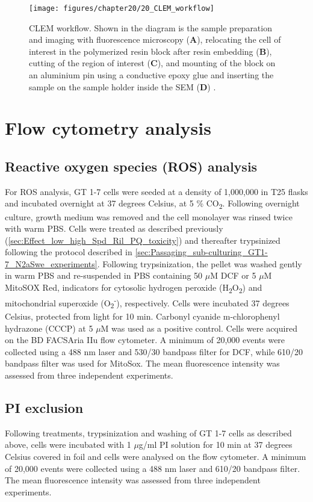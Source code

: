 \begin{figure}[!htbp]
  \texttt{[image: figures/chapter20/20\_CLEM\_workflow]}
  \caption[CLEM workflow]{CLEM workflow. Shown in the diagram is the sample preparation and imaging with fluorescence microscopy (\textbf{A}), relocating the cell of interest in the polymerized resin block after resin embedding (\textbf{B}), cutting of the region of interest (\textbf{C}), and mounting of the block on an aluminium pin using a conductive epoxy glue and inserting the sample on the sample holder inside the SEM (\textbf{D}) \citep{Russell2017}.}
  \label{fig:20_CLEM_workflow}
\end{figure}


\section{Flow cytometry analysis}
\subsection{Reactive oxygen species (ROS) analysis}
For ROS analysis, GT 1-7 cells were seeded at a density of 1,000,000 in T25 flasks and incubated overnight at 37 degrees Celsius, at 5 \% CO\textsubscript{2}. Following overnight culture, growth medium was removed and the cell monolayer was rinsed twice with warm PBS. Cells were treated as described previously (\cref{sec:Effect_low_high_Spd_Ril_PQ_toxicity}) and thereafter trypsinized following the protocol described in \cref{sec:Passaging_sub-culturing_GT1-7_N2aSwe_experiments}. Following trypsinization, the pellet was washed gently in warm PBS and re-suspended in PBS containing 50 $\mu$M DCF or 5 $\mu$M MitoSOX Red, indicators for cytosolic hydrogen peroxide (H\textsubscript{2}O\textsubscript{2}) and mitochondrial superoxide (O\textsubscript{2}\textsuperscript{-}), respectively. Cells were incubated 37 degrees Celsius, protected from light for 10 min. Carbonyl cyanide m-chlorophenyl hydrazone (CCCP) at 5 $\mu$M was used as a positive control. Cells were acquired on the BD FACSAria IIu flow cytometer. A minimum of 20,000 events were collected using a 488 nm laser and 530/30 bandpass filter for DCF, while 610/20 bandpass filter was used for MitoSox. The mean fluorescence intensity was assessed from three independent experiments. 


\subsection{PI exclusion}
Following treatments, trypsinization and washing of GT 1-7 cells as described above, cells were incubated with 1 $\mu$g/ml PI solution for 10 min at 37 degrees Celsius covered in foil and cells were analysed on the flow cytometer. A minimum of 20,000 events were collected using a 488 nm laser and 610/20 bandpass filter. The mean fluorescence intensity was assessed from three independent experiments. 

